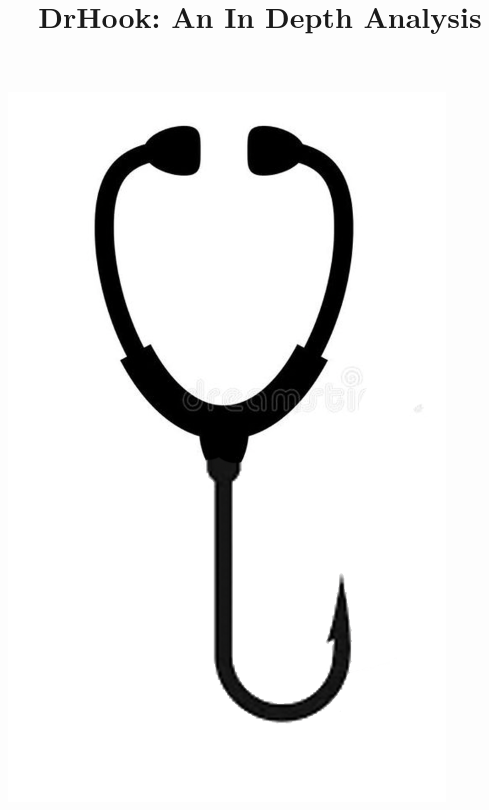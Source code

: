 \documentclass[techmemo]{ecmwfrep}%
\title{DrHook: An In Depth Analysis} %
\begin{document}
\maketitle


\begin{center}
\vspace{8em}
\includegraphics{img/DrHookLogo.png}    
\end{center}

\newpage
\tableofcontents

\newpage

\newpage

\newpage

\newpage

\newpage

\newpage

\end{document}
